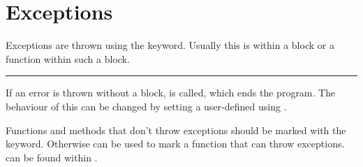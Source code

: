 \section{Exceptions}
    Exceptions are thrown using the  keyword. Usually this is within a  block or a function within such a block.
\vspace{-2mm}
\vspace{-4mm}
\columnwidth\rule[0mm]{0.6\columnwidth}{0.1pt}
\vspace{-2mm}
\vspace{-2mm}
    If an error is thrown without a  block,  is called, which ends the program.
    The behaviour of this can be changed by setting a user-defined  using .
    
    Functions and methods that don't throw exceptions should be marked with the  keyword. Otherwise  can be used to mark a function that can throw exceptions.
     can be found within .